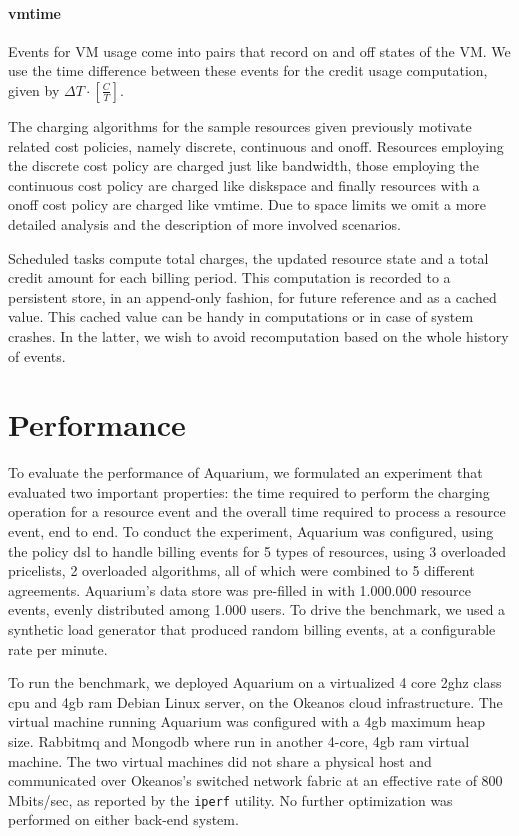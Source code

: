 \documentclass[letterpaper,twocolumn,10pt]{article}
\begin{document}
\paragraph{\textsf{vmtime}}
Events for VM usage come into pairs that record \textsf{on} and \textsf{off} states of the VM. We use the time difference between these events for the credit usage computation, given by $\Delta T \cdot [ \frac{C}{T} ]$.


The charging algorithms for the sample resources given previously motivate related cost policies, namely \textsf{discrete}, \textsf{continuous} and \textsf{onoff}. Resources employing the \textsf{discrete} cost policy are charged just like \textsf{bandwidth}, those employing the \textsf{continuous} cost policy are charged like \textsf{diskspace} and finally resources with a \textsf{onoff} cost policy are charged like \textsf{vmtime}. Due to space limits we omit a more detailed analysis and the description of more involved scenarios.

Scheduled tasks compute total charges, the updated resource state and
a total credit amount for each billing period. This computation is
recorded to a persistent store, in an append-only fashion, for future
reference and as a cached value. This cached value can be handy in
computations or in case of system crashes. In the latter, we wish to
avoid recomputation based on the whole history of events.

\section{Performance}

To evaluate the performance of Aquarium, we formulated an experiment
that evaluated two important properties: the time required to perform
the charging operation for a resource event and the overall time
required to process a resource event, end to end. To conduct the
experiment, Aquarium was configured, using the policy {\sc dsl} to
handle billing events for 5 types of resources, using 3 overloaded
pricelists, 2 overloaded algorithms, all of which were combined to 5
different agreements. Aquarium's data store was pre-filled in with
1.000.000 resource events, evenly distributed among 1.000 users. To
drive the benchmark, we used a synthetic load generator that produced
random billing events, at a configurable rate per minute.

To run the benchmark, we deployed Aquarium on a virtualized 4 core 2{\sc gh}z
class {\sc cpu} and 4{\sc gb} {\sc ram} Debian Linux server, on the Okeanos
cloud infrastructure. The virtual machine running Aquarium was configured with
a 4{\sc gb} maximum heap size.  Rabbit{\sc mq} and Mongo{\sc db} where run in
another 4-core, 4{\sc gb ram} virtual machine. The two virtual machines did not
share a physical host and communicated over Okeanos's switched network fabric
at an effective rate of 800 Mbits/sec, as reported by the \texttt{iperf}
utility. No
further optimization was performed on either back-end system.
\end{document}
